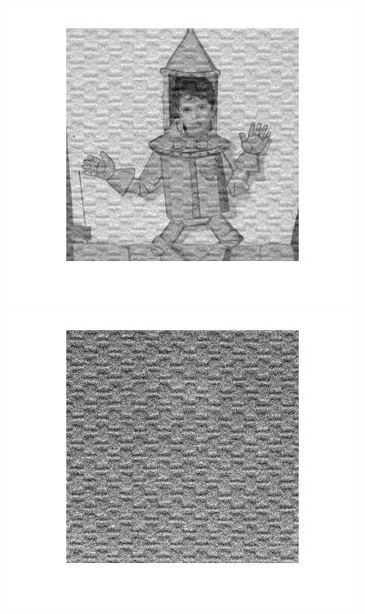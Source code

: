 \begin{figure}
{\begin{minipage}[b]{0.23\linewidth}
\includegraphics[width=1\linewidth]{images/separated1.png}\vspace{4pt}
\includegraphics[width=1\linewidth]{images/separated2.png}
\end{minipage}}
\end{figure}
